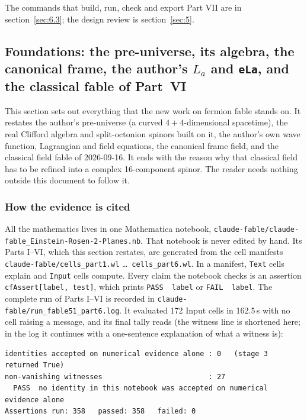 The commands that build, run, check and export Part VII are in section~\ref{sec:6.3}; the design review is section~\ref{sec:5}.

\medskip

\begingroup\sloppy

\subsection[Foundations: the pre-universe, its algebra, the canonical frame, the author's La and eLa, and the classical fable of Part VI]{Foundations: the pre-universe, its algebra, the canonical frame, the author's \texorpdfstring{$L_a$}{La} and \texttt{eLa}, and the classical fable of Part~VI}
\label{fnd:sec}\label{sec:3.1}

This section sets out everything that the new work on fermion fable stands on. It restates the
author's pre-universe (a curved $4+4$-dimensional spacetime), the real Clifford algebra and
split-octonion spinors built on it, the author's own wave function, Lagrangian and field
equations, the canonical frame field, and the classical field fable of 2026-09-16. It ends with
the reason why that classical field has to be refined into a complex 16-component spinor. The
reader needs nothing outside this document to follow it.

\subsubsection{How the evidence is cited}
\label{fnd:evidence}\label{sec:3.1.1}

All the mathematics lives in one Mathematica notebook,
\texttt{claude-fable/claude-fable\_Einstein-Rosen-2-Planes.nb}. That notebook is never edited by
hand. Its Parts I--VI, which this section restates, are generated from the cell manifests
\texttt{claude-fable/cells\_part1.wl} \dots\ \texttt{cells\_part6.wl}. In a manifest,
\texttt{Text} cells explain and \texttt{Input} cells compute. Every claim the notebook checks is
an assertion \texttt{cfAssert[label, test]}, which prints \texttt{PASS~~label} or
\texttt{FAIL~~label}. The complete run of Parts I--VI is recorded in
\texttt{claude-fable/run\_fable51\_part6.log}. It evaluated 172 Input cells in 162.5\,s with no
cell raising a message, and its final tally reads (the witness line is shortened here; in the
log it continues with a one-sentence explanation of what a witness is):
\begin{footnotesize}
\begin{verbatim}
identities accepted on numerical evidence alone : 0   (stage 3 returned True)
non-vanishing witnesses                         : 27
  PASS  no identity in this notebook was accepted on numerical evidence alone
Assertions run: 358   passed: 358   failed: 0
\end{verbatim}
\end{footnotesize}

